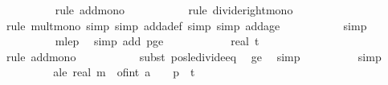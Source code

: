 \begin{isabellebody}
\ \ \ \ \ \ \ \ \isamarkupfalse%
\ {\isacharparenleft}{\kern0pt}rule\ add{\isacharunderscore}{\kern0pt}mono{\isacharparenright}{\kern0pt}\isanewline
\ \ \ \ \ \ \ \ \ \isamarkupfalse%
\ {\isacharparenleft}{\kern0pt}rule\ divide{\isacharunderscore}{\kern0pt}right{\isacharunderscore}{\kern0pt}mono{\isacharparenright}{\kern0pt}\isanewline
\ \ \ \ \ \ \ \ \ \ \isamarkupfalse%
\ {\isacharparenleft}{\kern0pt}rule\ mult{\isacharunderscore}{\kern0pt}mono{\isacharcomma}{\kern0pt}\ simp{\isacharcomma}{\kern0pt}\ simp\ add{\isacharcolon}{\kern0pt}a{\isacharunderscore}{\kern0pt}def{\isacharcomma}{\kern0pt}\ simp{\isacharcomma}{\kern0pt}\ simp\ add{\isacharcolon}{\kern0pt}a{\isacharunderscore}{\kern0pt}ge{\isacharunderscore}{\kern0pt}{}{\isacharparenright}{\kern0pt}\isanewline
\ \ \ \ \ \ \ \ \ \isamarkupfalse%
\ {\isacharparenleft}{\kern0pt}simp{\isacharparenright}{\kern0pt}\isanewline
\ \ \ \ \ \ \ \ \isamarkupfalse%
\ m{\isacharunderscore}{\kern0pt}le{\isacharunderscore}{\kern0pt}p\ \isamarkupfalse%
\ {\isacharparenleft}{\kern0pt}simp\ add{\isacharcolon}{\kern0pt}\ p{\isacharunderscore}{\kern0pt}ge{\isacharunderscore}{\kern0pt}{}{\isacharparenright}{\kern0pt}\isanewline
\ \ \ \ \ \ \isamarkupfalse%
\ \isamarkupfalse%
\ {\isachardoublequoteopen}{\isachardot}{\kern0pt}{\isachardot}{\kern0pt}{\isachardot}{\kern0pt}\ {\isasymle}\ real\ t\ {\isacharslash}{\kern0pt}\ {\isacharparenleft}{\kern0pt}{}{\isacharplus}{\kern0pt}{\isasymdelta}{\isacharprime}{\kern0pt}{\isacharparenright}{\kern0pt}\ {\isacharplus}{\kern0pt}\ {}{\isachardoublequoteclose}\isanewline
\ \ \ \ \ \ \ \ \isamarkupfalse%
\ {\isacharparenleft}{\kern0pt}rule\ add{\isacharunderscore}{\kern0pt}mono{\isacharparenright}{\kern0pt}\isanewline
\ \ \ \ \ \ \ \ \ \isamarkupfalse%
\ {\isacharparenleft}{\kern0pt}subst\ pos{\isacharunderscore}{\kern0pt}le{\isacharunderscore}{\kern0pt}divide{\isacharunderscore}{\kern0pt}eq{\isacharparenright}{\kern0pt}\ \isamarkupfalse%
\ {\isasymdelta}{\isacharprime}{\kern0pt}{\isacharunderscore}{\kern0pt}ge{\isacharunderscore}{\kern0pt}{}\ \isamarkupfalse%
\ simp\isanewline
\ \ \ \ \ \ \ \ \isamarkupfalse%
\ simp{\isacharplus}{\kern0pt}\isanewline
\ \ \ \ \ \ \isamarkupfalse%
\ \isamarkupfalse%
\ a{\isacharunderscore}{\kern0pt}le{\isacharunderscore}{\kern0pt}{}{\isacharcolon}{\kern0pt}\ {\isachardoublequoteopen}real\ m\ {\isacharasterisk}{\kern0pt}\ {\isacharparenleft}{\kern0pt}of{\isacharunderscore}{\kern0pt}int\ a\ {\isacharplus}{\kern0pt}\ {}{\isacharparenright}{\kern0pt}\ {\isacharslash}{\kern0pt}\ p\ {\isasymle}\ t\ {\isacharslash}{\kern0pt}\ {\isacharparenleft}{\kern0pt}{}{\isacharplus}{\kern0pt}\ {\isasymdelta}{\isacharprime}{\kern0pt}{\isacharparenright}{\kern0pt}\ {\isacharplus}{\kern0pt}\ {}{\isachardoublequoteclose}\isanewline

\end{isabellebody}
